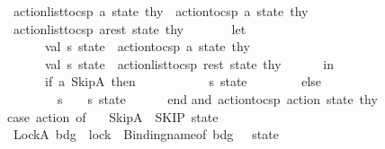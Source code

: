 \begin{isabellebody}
\ \ {\isacharbar}{\kern0pt}\ action{\isacharunderscore}{\kern0pt}list{\isacharunderscore}{\kern0pt}to{\isacharunderscore}{\kern0pt}csp\ {\isacharbrackleft}{\kern0pt}a{\isacharbrackright}{\kern0pt}\ state\ thy\ {\isacharequal}{\kern0pt}\ action{\isacharunderscore}{\kern0pt}to{\isacharunderscore}{\kern0pt}csp\ a\ state\ thy\isanewline
\ \ {\isacharbar}{\kern0pt}\ action{\isacharunderscore}{\kern0pt}list{\isacharunderscore}{\kern0pt}to{\isacharunderscore}{\kern0pt}csp\ {\isacharparenleft}{\kern0pt}a{\isacharcolon}{\kern0pt}{\isacharcolon}{\kern0pt}rest{\isacharparenright}{\kern0pt}\ state\ thy\ {\isacharequal}{\kern0pt}\isanewline
\ \ \ \ \ \ let\isanewline
\ \ \ \ \ \ \ \ val\ {\isacharparenleft}{\kern0pt}s{}{\isacharcomma}{\kern0pt}\ state{}{\isacharparenright}{\kern0pt}\ {\isacharequal}{\kern0pt}\ action{\isacharunderscore}{\kern0pt}to{\isacharunderscore}{\kern0pt}csp\ a\ state\ thy\isanewline
\ \ \ \ \ \ \ \ val\ {\isacharparenleft}{\kern0pt}s{}{\isacharcomma}{\kern0pt}\ state{}{\isacharparenright}{\kern0pt}\ {\isacharequal}{\kern0pt}\ action{\isacharunderscore}{\kern0pt}list{\isacharunderscore}{\kern0pt}to{\isacharunderscore}{\kern0pt}csp\ rest\ state{}\ thy\isanewline
\ \ \ \ \ \ in\isanewline
\ \ \ \ \ \ \ \ if\ {\isacharparenleft}{\kern0pt}a\ {\isacharequal}{\kern0pt}SkipA{\isacharparenright}{\kern0pt}\ then\ \isanewline
\ \ \ \ \ \ \ \ \ \ {\isacharparenleft}{\kern0pt}s{}{\isacharcomma}{\kern0pt}\ state{}{\isacharparenright}{\kern0pt}\isanewline
\ \ \ \ \ \ \ \ else\isanewline
\ \ \ \ \ \ \ \ \ \ {\isacharparenleft}{\kern0pt}s{}\ {\isacharcircum}{\kern0pt}\ {\isachardoublequote}{\kern0pt}{\isasymrightarrow}{\isachardoublequote}{\kern0pt}\ {\isacharcircum}{\kern0pt}\ s{}{\isacharcomma}{\kern0pt}\ state{}{\isacharparenright}{\kern0pt}\isanewline
\ \ \ \ \ \ end\isanewline
\isanewline
and\ action{\isacharunderscore}{\kern0pt}to{\isacharunderscore}{\kern0pt}csp\ action\ state\ thy\ {\isacharequal}{\kern0pt}\isanewline
\ \ case\ action\ of\isanewline
\ \ \ SkipA\ {\isacharequal}{\kern0pt}{\isachargreater}{\kern0pt}\ {\isacharparenleft}{\kern0pt}{\isachardoublequote}{\kern0pt}SKIP{\isachardoublequote}{\kern0pt}{\isacharcomma}{\kern0pt}\ state{\isacharparenright}{\kern0pt}\isanewline
\ \ {\isacharbar}{\kern0pt}\ LockA\ bdg\ {\isacharequal}{\kern0pt}{\isachargreater}{\kern0pt}\ {\isacharparenleft}{\kern0pt}{\isachardoublequote}{\kern0pt}lock{\isacharunderscore}{\kern0pt}{\isachardoublequote}{\kern0pt}\ {\isacharcircum}{\kern0pt}\ Binding{\isachardot}{\kern0pt}name{\isacharunderscore}{\kern0pt}of\ bdg\ {\isacharcircum}{\kern0pt}\ {\isachardoublequote}{\kern0pt}{\isacharbang}{\kern0pt}{}{\isachardoublequote}{\kern0pt}{\isacharcomma}{\kern0pt}\ state{\isacharparenright}{\kern0pt}\isanewline

\end{isabellebody}
